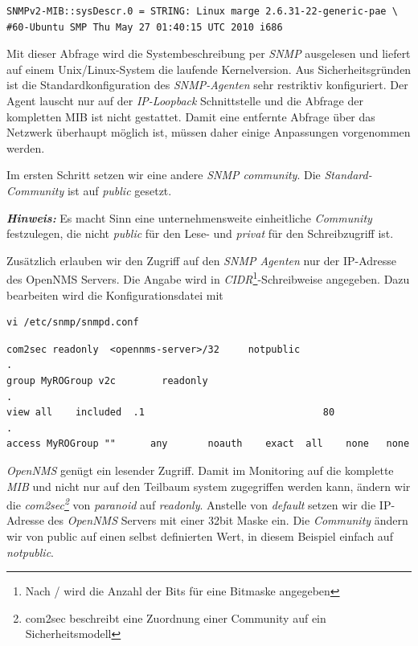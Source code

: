 \begin{lstlisting}[numbers=none]
SNMPv2-MIB::sysDescr.0 = STRING: Linux marge 2.6.31-22-generic-pae \
#60-Ubuntu SMP Thu May 27 01:40:15 UTC 2010 i686
\end{lstlisting}

Mit dieser Abfrage wird die Systembeschreibung per \emph{SNMP} ausgelesen und liefert auf einem Unix/Linux-System die laufende Kernelversion.
Aus Sicherheitsgründen ist die Standardkonfiguration des \emph{SNMP-Agenten} sehr restriktiv konfiguriert. Der Agent lauscht nur auf der \emph{IP-Loopback} Schnittstelle und die Abfrage der kompletten MIB ist nicht gestattet. Damit eine entfernte Abfrage über das Netzwerk überhaupt möglich ist, müssen daher einige Anpassungen vorgenommen werden.

Im ersten Schritt setzen wir eine andere \emph{SNMP community}. Die \emph{Standard-Community} ist auf \emph{public} gesetzt. 

\textbf{\textit{Hinweis:}} Es macht Sinn eine unternehmensweite einheitliche \emph{Community} festzulegen, die nicht \emph{public} für den Lese- und \emph{privat} für den Schreibzugriff ist.

Zusätzlich erlauben wir den Zugriff auf den \emph{SNMP Agenten} nur der IP-Adresse des OpenNMS Servers. Die Angabe wird in \emph{CIDR}\footnote{Nach / wird die Anzahl der Bits für eine Bitmaske angegeben}-Schreibweise angegeben. Dazu bearbeiten wird die Konfigurationsdatei mit

\begin{lstlisting}[numbers=none]
vi /etc/snmp/snmpd.conf
\end{lstlisting}

\begin{lstlisting}
com2sec readonly  <opennms-server>/32     notpublic
.
group MyROGroup v2c        readonly
.
view all    included  .1                               80
.
access MyROGroup ""      any       noauth    exact  all    none   none
\end{lstlisting}

\emph{OpenNMS} genügt ein lesender Zugriff. Damit im Monitoring auf die komplette \emph{MIB} und nicht nur auf den Teilbaum system zugegriffen werden kann, ändern wir die \emph{com2sec\footnote{com2sec beschreibt eine Zuordnung einer Community auf ein Sicherheitsmodell}} von \emph{paranoid} auf \emph{readonly}. Anstelle von \emph{default} setzen wir die IP-Adresse des \emph{OpenNMS} Servers mit einer 32bit Maske ein. Die \emph{Community} ändern wir von public auf einen selbst definierten Wert, in diesem Beispiel einfach auf \emph{notpublic}.

